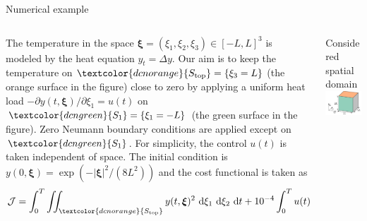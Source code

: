 \documentclass[mathserif]{beamer}
\begin{document}
\begin{frame}
\begin{columns}[T]
\begin{column}{.45\textwidth}
\begin{block}{Numerical example}
    \vspace{0.5cm}
    \begin{columns}
    \begin{column}{0.59\textwidth}
    The temperature in the space $\boldsymbol \xi = (\xi_1, \xi_2, \xi_3) \in [-L,L]^3$ is modeled by the heat equation $y_t = \Delta y$. Our aim is to keep the temperature on $\textcolor{dcnorange}{S_{\mathrm{top}}} = \{ \xi_3 = L \}$ (the \textcolor{dcnorange}{orange} surface in the figure) close to zero by applying a uniform heat load $-\partial y(t,\boldsymbol \xi)/\partial \xi_1 = u(t)$ on $\textcolor{dcngreen}{S_1} = \{ \xi_1 = -L \}$ (the \textcolor{dcngreen}{green} surface in the figure). Zero Neumann boundary conditions are applied except on $\textcolor{dcngreen}{S_1}$. For simplicity, the control $u(t)$ is taken independent of space. The initial condition is $y(0,\boldsymbol \xi) = \exp(-| \boldsymbol \xi |^2 / (8L^2))$ and the cost functional is taken as
    \begin{equation}
    \mathcal{J} = \int_0^T \iint_{\textcolor{dcnorange}{S_{\mathrm{top}}}} y(t,\boldsymbol \xi)^2 \ \mathrm{d}\xi_1  \ \mathrm{d}\xi_2 \ \mathrm{d}t + 10^{-4}\int_0^T u(t)^2 \ \mathrm{d}t.
    \end{equation}
    \end{column}
    
	\begin{column}{0.37\textwidth}
	\begin{center}
	Considered spatial domain
	\vspace{1cm}
	\includegraphics[width=\columnwidth]{Figures/Example.pdf}
	\end{center}
	\end{column}
	

\end{columns}
\end{block}
\end{column}
\end{columns}
\end{frame}
\end{document}
